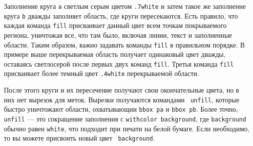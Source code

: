 \documentclass{article} %
\begin{document}
Заполнение круга {\tt a} светлым серым цветом {\tt .7white} и затем такое 
же заполнение круга {\tt b} дважды заполняет область, где круги пересекаются. 
Есть правило, что каждая команда {\tt fill} присваивает данный цвет 
всем точкам покрываемого региона, уничтожая все, что там было, включая 
линии, текст и заполненные области.
Таким образом, важно задавать команды {\tt fill} в правильном порядке.
В примере выше перекрываемая область получает одинаковый цвет дважды, 
оставаясь светлосерой после первых двух команд {\tt fill}.
Третья команда {\tt fill} присваивает более темный цвет {\tt .4white} 
перекрываемой области.

После этого круги и их пересечение получают свои окончательные цвета, но 
в них нет вырезок для меток. 
Вырезки получаются командами {\tt 
unfill}\label{Dunfill}, которые 
быстро уничтожают области, охватывающии {\tt bbox
pa} и {\tt bbox pb}. 
Более точно, {\tt unfill} --- это сокращение заполнения с {\tt withcolor 
background}, где {\tt background} обычно равен {\tt white}, что подходит 
при печати на белой бумаге.
Если необходимо, то вы можете присвоить новый цвет {\tt
background}\label{Dbground}.
\end{document}
